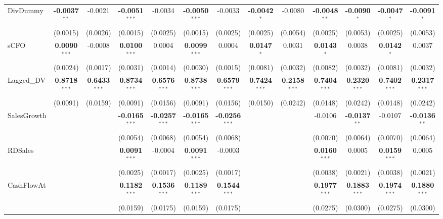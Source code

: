 \documentclass[11pt,a4paper]{article}
\begin{document}
\begin{table}[htbp]
\begin{tabular}{lcccccccccccc}
DivDummy & \textbf{-0.0037}$^{**}$ & -0.0021 & \textbf{-0.0051}$^{***}$ & -0.0034 & \textbf{-0.0050}$^{***}$ & -0.0033 & \textbf{-0.0042}$^{*}$ & -0.0080 & \textbf{-0.0048}$^{**}$ & \textbf{-0.0090}$^{*}$ & \textbf{-0.0047}$^{*}$ & \textbf{-0.0091}$^{*}$ \\
 & (0.0015) & (0.0026) & (0.0015) & (0.0025) & (0.0015) & (0.0025) & (0.0025) & (0.0054) & (0.0025) & (0.0053) & (0.0025) & (0.0053) \\
sCFO & \textbf{0.0090}$^{***}$ & -0.0008 & \textbf{0.0100}$^{***}$ & 0.0004 & \textbf{0.0099}$^{***}$ & 0.0004 & \textbf{0.0147}$^{*}$ & 0.0031 & \textbf{0.0143}$^{*}$ & 0.0038 & \textbf{0.0142}$^{*}$ & 0.0037 \\
 & (0.0024) & (0.0017) & (0.0031) & (0.0014) & (0.0030) & (0.0015) & (0.0081) & (0.0032) & (0.0082) & (0.0032) & (0.0081) & (0.0032) \\
Lagged\_DV & \textbf{0.8718}$^{***}$ & \textbf{0.6433}$^{***}$ & \textbf{0.8734}$^{***}$ & \textbf{0.6576}$^{***}$ & \textbf{0.8738}$^{***}$ & \textbf{0.6579}$^{***}$ & \textbf{0.7424}$^{***}$ & \textbf{0.2158}$^{***}$ & \textbf{0.7404}$^{***}$ & \textbf{0.2320}$^{***}$ & \textbf{0.7402}$^{***}$ & \textbf{0.2317}$^{***}$ \\
 & (0.0091) & (0.0159) & (0.0091) & (0.0156) & (0.0091) & (0.0156) & (0.0150) & (0.0242) & (0.0148) & (0.0242) & (0.0148) & (0.0242) \\
SalesGrowth &  &  & \textbf{-0.0165}$^{***}$ & \textbf{-0.0257}$^{***}$ & \textbf{-0.0165}$^{***}$ & \textbf{-0.0256}$^{***}$ &  &  & -0.0106 & \textbf{-0.0137}$^{**}$ & -0.0107 & \textbf{-0.0136}$^{**}$ \\
 &  &  & (0.0054) & (0.0068) & (0.0054) & (0.0068) &  &  & (0.0070) & (0.0064) & (0.0070) & (0.0064) \\
RDSales &  &  & \textbf{0.0091}$^{***}$ & -0.0004 & \textbf{0.0091}$^{***}$ & -0.0003 &  &  & \textbf{0.0160}$^{***}$ & 0.0005 & \textbf{0.0159}$^{***}$ & 0.0005 \\
 &  &  & (0.0025) & (0.0017) & (0.0025) & (0.0017) &  &  & (0.0038) & (0.0021) & (0.0038) & (0.0021) \\
CashFlowAt &  &  & \textbf{0.1182}$^{***}$ & \textbf{0.1536}$^{***}$ & \textbf{0.1189}$^{***}$ & \textbf{0.1544}$^{***}$ &  &  & \textbf{0.1977}$^{***}$ & \textbf{0.1883}$^{***}$ & \textbf{0.1974}$^{***}$ & \textbf{0.1880}$^{***}$ \\
 &  &  & (0.0159) & (0.0175) & (0.0159) & (0.0175) &  &  & (0.0275) & (0.0300) & (0.0275) & (0.0300) \\

\end{tabular}
\end{table}
\end{document}
